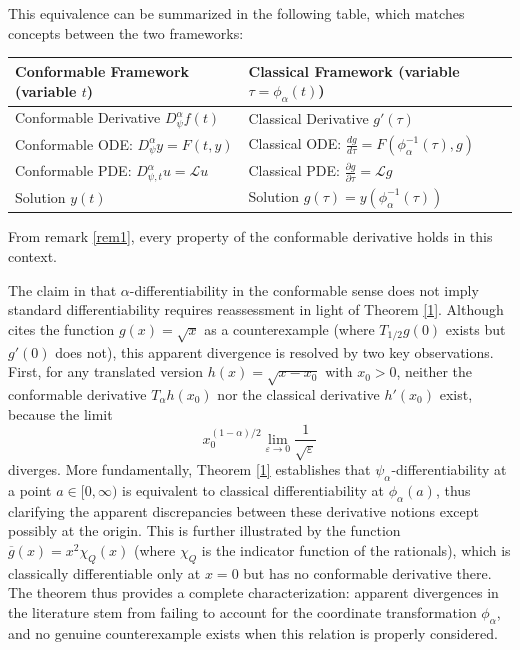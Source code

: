 \documentclass[preprint,12pt]{elsarticle}
\begin{document}
This equivalence can be summarized in the following table, which matches concepts between the two frameworks:


\begin{center}
    \begin{tabular}{ll}
    \toprule
    \textbf{Conformable Framework (variable $t$)} & \textbf{Classical Framework (variable $\tau = \phi_\alpha(t)$)} \\
    \midrule
    Conformable Derivative $D_{\psi}^{\alpha} f(t)$ & Classical Derivative $g'(\tau)$ \\
    Conformable ODE: $D_{\psi}^{\alpha} y = F(t, y)$ & Classical ODE: $\frac{dg}{d\tau} = F(\phi_{\alpha}^{-1}(\tau), g)$ \\
    Conformable PDE: $D_{\psi,t}^{\alpha} u = \mathcal{L}u$ & Classical PDE: $\frac{\partial g}{\partial \tau} = \mathcal{L}g$ \\
    Solution $y(t)$ & Solution $g(\tau) = y(\phi_{\alpha}^{-1}(\tau))$ \\
    \bottomrule
    \end{tabular}
\end{center}





From remark \ref{rem1}, every property of the conformable derivative holds in this context.

 The claim in \cite{3} that $\alpha$-differentiability in the conformable sense does not imply standard differentiability requires reassessment in light of Theorem \ref{1}. Although \cite{3} cites the function $g(x) = \sqrt{x}$ as a counterexample (where $T_{1/2}g(0)$ exists but $g'(0)$ does not), this apparent divergence is resolved by two key observations. First, for any translated version $h(x) = \sqrt{x-x_0}$ with $x_0 > 0$, neither the conformable derivative $T_\alpha h(x_0)$ nor the classical derivative $h'(x_0)$ exist, because the limit
\[
x_0^{(1-\alpha)/2} \lim_{\varepsilon\to 0} \frac{1}{\sqrt{\varepsilon}}
\]
diverges. More fundamentally, Theorem \ref{1} establishes that $\psi_\alpha$-differentiability at a point $a \in [0,\infty)$ is equivalent to classical differentiability at $\phi_\alpha(a)$, thus clarifying the apparent discrepancies between these derivative notions except possibly at the origin. This is further illustrated by the function $\overline{g}(x) = x^2\chi_Q(x)$ (where $\chi_Q$ is the indicator function of the rationals), which is classically differentiable only at $x = 0$ but has no conformable derivative there. The theorem thus provides a complete characterization: apparent divergences in the literature stem from failing to account for the coordinate transformation $\phi_\alpha$, and no genuine counterexample exists when this relation is properly considered.
\end{document}
